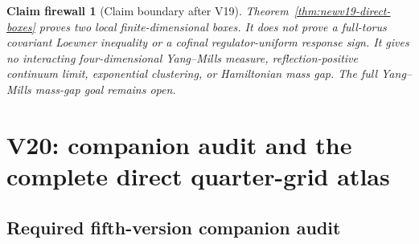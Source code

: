 \documentclass[11pt,oneside]{article}
\newtheorem{firewall}[theorem]{Claim firewall}
\theoremstyle{definition}
\theoremstyle{remark}
\begin{document}
\begin{firewall}[Claim boundary after V19]
\label{fire:newv19-final}
Theorem~\ref{thm:newv19-direct-boxes} proves two local
finite-dimensional boxes.  It does not prove a full-torus covariant
Loewner inequality or a cofinal regulator-uniform response sign.
It gives no
interacting four-dimensional Yang--Mills measure,
reflection-positive continuum limit, exponential clustering, or
Hamiltonian mass gap.  The full Yang--Mills mass-gap goal remains
open.
\end{firewall}

\section{V20: companion audit and the complete direct quarter-grid atlas}
\label{sec:newv20-direct-grid}

\subsection{Required fifth-version companion audit}
\end{document}
